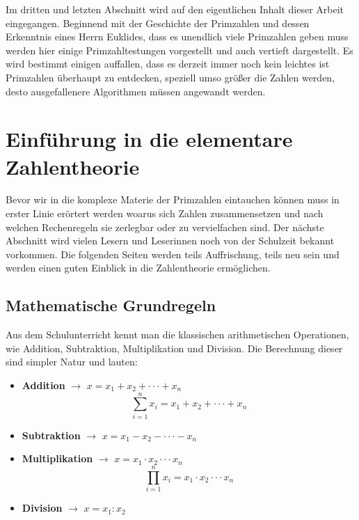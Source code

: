 \documentclass[12pt,a4paper]{article}
\theoremstyle{definition}
\begin{document}
Im dritten und letzten Abschnitt wird auf den eigentlichen Inhalt dieser Arbeit eingegangen.
Beginnend mit der Geschichte der Primzahlen und dessen Erkenntnis eines Herrn Euklides, dass es unendlich viele Primzahlen geben muss werden hier einige Primzahltestungen vorgestellt und auch vertieft dargestellt.
Es wird bestimmt einigen auffallen, dass es derzeit immer noch kein leichtes ist Primzahlen überhaupt zu entdecken, speziell umso größer die Zahlen werden, desto ausgefallenere Algorithmen müssen angewandt werden.
\newpage

\setcounter{section}{0}
\setcounter{page}{1}
\section{Einführung in die elementare Zahlentheorie}
Bevor wir in die komplexe Materie der Primzahlen eintauchen können muss in erster Linie erörtert werden woarus sich Zahlen zusammensetzen und nach welchen Rechenregeln sie zerlegbar oder zu vervielfachen sind.
Der nächste Abschnitt wird vielen Lesern und Leserinnen noch von der Schulzeit bekannt vorkommen.
Die folgenden Seiten werden teils Auffrischung, teils neu sein und werden einen guten Einblick in die Zahlentheorie ermöglichen.

\subsection{Mathematische Grundregeln}\label{Mathematische Grundregeln}
Aus dem Schulunterricht kennt man die klassischen arithmetischen Operationen, wie Addition, Subtraktion, Multiplikation und Division.
Die Berechnung dieser sind simpler Natur und lauten:
\begin{itemize}
\item \textbf{Addition} $\to$ $x = x_{1} + x_{2} + \cdot\cdot\cdot + x_{n}$
\[\sum_{i=1}^n x_{i} = x_{1} + x_{2} +  \cdot\cdot\cdot + x_{n}\]

\item \textbf{Subtraktion} $\to$ $x = x_{1} - x_{2} - \cdot\cdot\cdot - x_{n}$

\item \textbf{Multiplikation} $\to$ $x = x_{1} \cdot x_{2} \cdot\cdot\cdot x_{n}$
\[\prod_{i=1}^n x_{i} = x_{1} \cdot x_{2} \cdot\cdot\cdot x_{n}\]

\item \textbf{Division} $\to$ $x = x_{1} : x_{2}$
\end{itemize}
\end{document}
